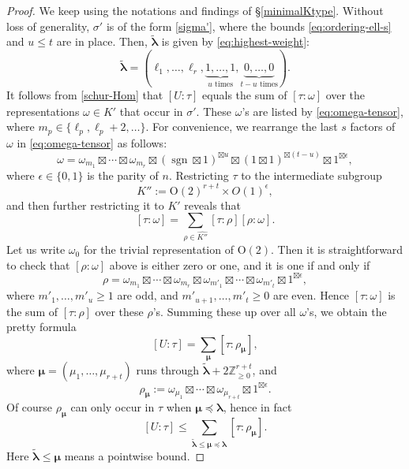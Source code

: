 \documentclass[11pt,oneside]{amsart}
\numberwithin{equation}{section}
\theoremstyle{remark}
\theoremstyle{plain}
\DeclareMathOperator{\sgn}{sgn}
\newcommand\OO{\mathrm{O}}
\newcommand\ZZ{\mathbb{Z}}
\renewcommand\leq{\leqslant}
\renewcommand\geq{\geqslant}
\begin{document}
\begin{proof} We keep using the notations and findings of \S\ref{minimalKtype}. Without loss of generality, $\sigma'$ is of the form \eqref{sigma'}, where the bounds \eqref{eq:ordering-ell-s} and $u\leq t$ are in
place. Then, $\tilde{\bm\lambda}$ is given by \eqref{eq:highest-weight}:
\[\tilde{\bm\lambda}=(\ell_1,\dotsc,\ell_r,\underbrace{1,\dotsc,1}_{\text{$u$ times}},\underbrace{0,\dotsc,0}_{\text{$t-u$ times}}).\]
It follows from \eqref{schur-Hom} that $[U:\tau]$ equals the sum of $[\tau:\omega]$ over the representations $\omega\in\widehat{K'}$ that occur in $\sigma'$. These $\omega$'s are listed by \eqref{eq:omega-tensor}, where $m_p\in\{\ell_p,\ell_p+2,\dotsc\}$. For convenience, we rearrange the last $s$ factors of $\omega$ in \eqref{eq:omega-tensor} as follows:
\[\omega=\omega_{m_1}\boxtimes\dotsb\boxtimes\omega_{m_r}
\boxtimes(\sgn\boxtimes 1)^{\boxtimes u}\boxtimes(1\boxtimes 1)^{\boxtimes(t-u)}\boxtimes 1^{\boxtimes\epsilon},\]
where $\epsilon\in\{0,1\}$ is the parity of $n$. Restricting $\tau$ to the intermediate subgroup
\[K'':=\OO(2)^{r+t}\times O(1)^\epsilon,\]
and then further restricting it to $K'$ reveals that
\[[\tau:\omega]=\sum_{\rho\in\widehat{K''}}[\tau:\rho][\rho:\omega].\]
Let us write $\omega_0$ for the trivial representation of $\OO(2)$. Then it is straightforward to check that $[\rho:\omega]$ above is either zero or one, and it is one if and only if
\[\rho=\omega_{m_1}\boxtimes\dotsb\boxtimes\omega_{m_r}\boxtimes\omega_{m'_1}\boxtimes\dotsb\boxtimes\omega_{m'_t}\boxtimes 1^{\boxtimes\epsilon},\]
where $m'_1,\dotsc,m'_u\geq 1$ are odd, and $m'_{u+1},\dotsc,m'_t\geq 0$ are even. Hence $[\tau:\omega]$ is the sum of $[\tau:\rho]$ over these $\rho$'s. Summing these up over all $\omega$'s, we obtain the pretty formula
\[[U:\tau]=\sum_{\bm\mu}[\tau:\rho_{\bm\mu}],\]
where $\bm\mu=(\mu_1,\dotsc,\mu_{r+t})$ runs through $\tilde{\bm\lambda}+2\ZZ_{\geq 0}^{r+t}$, and
\begin{equation}\label{rhodecomp}
\rho_{\bm\mu}:=\omega_{\mu_1}\boxtimes\dotsb\boxtimes\omega_{\mu_{r+t}}\boxtimes 1^{\boxtimes\epsilon}.
\end{equation}
Of course $\rho_{\bm\mu}$ can only occur in $\tau$ when $\bm\mu\preceq\bm\lambda$, hence in fact
\begin{equation}\label{Utaubound}
[U:\tau]\leq\sum_{\tilde{\bm\lambda}\leq\bm\mu\preceq\bm\lambda}[\tau:\rho_{\bm\mu}].
\end{equation}
Here $\tilde{\bm\lambda}\leq\bm\mu$ means a pointwise bound.


\end{proof}
\end{document}
